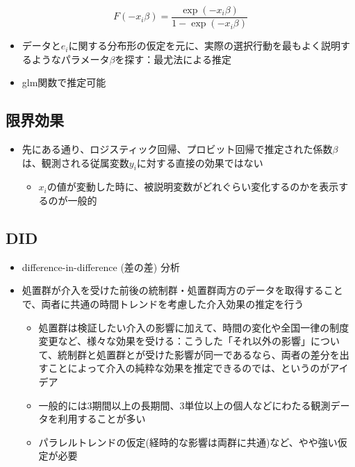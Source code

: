 \documentclass[
]{ltjsarticle}
\providecommand{\tightlist}{%
  \setlength{\itemsep}{0pt}\setlength{\parskip}{0pt}}
\begin{document}
\[F(-x_i \beta) =  \dfrac{\exp(-x_i\beta)}{1 - \exp(-x_i\beta)}\]

\begin{itemize}
\tightlist
\item
  データと\(e_i\)に関する分布形の仮定を元に、実際の選択行動を最もよく説明するようなパラメータ\(\beta\)を探す：最尤法による推定
\item
  glm関数で推定可能
\end{itemize}

\hypertarget{ux9650ux754cux52b9ux679c}{%
\subsection{限界効果}\label{ux9650ux754cux52b9ux679c}}

\begin{itemize}
\tightlist
\item
  先にある通り、ロジスティック回帰、プロビット回帰で推定された係数\(\beta\)は、観測される従属変数\(y_i\)に対する直接の効果ではない

  \begin{itemize}
  \tightlist
  \item
    \(x_i\)の値が変動した時に、被説明変数がどれぐらい変化するのかを表示するのが一般的
  \end{itemize}
\end{itemize}

\hypertarget{did}{%
\subsection{DID}\label{did}}

\begin{itemize}
\tightlist
\item
  difference-in-difference (差の差) 分析
\item
  処置群が介入を受けた前後の統制群・処置群両方のデータを取得することで、両者に共通の時間トレンドを考慮した介入効果の推定を行う

  \begin{itemize}
  \tightlist
  \item
    処置群は検証したい介入の影響に加えて、時間の変化や全国一律の制度変更など、様々な効果を受ける：こうした「それ以外の影響」について、統制群と処置群とが受けた影響が同一であるなら、両者の差分を出すことによって介入の純粋な効果を推定できるのでは、というのがアイデア
  \item
    一般的には3期間以上の長期間、3単位以上の個人などにわたる観測データを利用することが多い
  \item
    パラレルトレンドの仮定(経時的な影響は両群に共通)など、やや強い仮定が必要
  \end{itemize}
\end{itemize}
\end{document}
